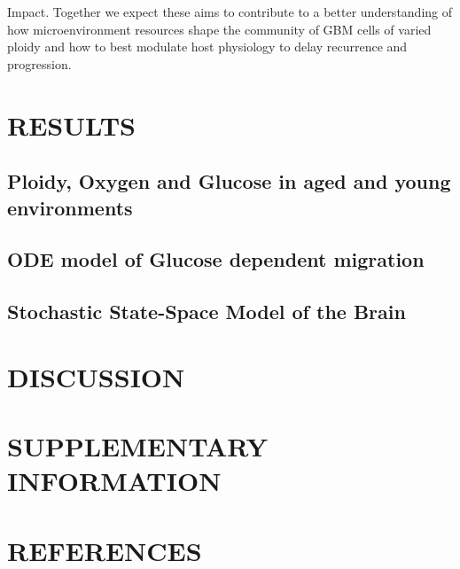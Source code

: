 \documentclass[times,twoside]{zHenriquesLab-StyleBioRxiv}
\begin{document}
Impact.   Together we expect these aims to contribute to a better understanding of how microenvironment resources shape the community of GBM cells of varied ploidy and how to best modulate host physiology to delay recurrence and progression.

\section*{RESULTS}
\subsection*{Ploidy, Oxygen and Glucose in aged and young environments}

\subsection*{ODE model of Glucose dependent migration} 

\subsection*{Stochastic State-Space Model of the Brain} 

\section*{DISCUSSION}

\section*{SUPPLEMENTARY INFORMATION}

\section*{REFERENCES}



\end{document}
